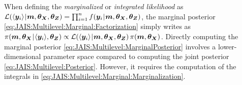 When defining the \textit{marginalized} or \textit{integrated likelihood} as 
\(\mathcal{L}(\langle{\bm{y}_i}\rangle {\:\!}|{\:\!} \bm{m},\bm{\theta}_{\bm{X}}, \bm{\theta}_{\bm{Z}}) = \prod_{i=1}^n f(\bm{y}_i {\:\!}|{\:\!} \bm{m},\bm{\theta}_{\bm{X}},\bm{\theta}_{\bm{Z}})\),
the marginal posterior \cref{eq:JAIS:Multilevel:Marginal:Factorization} simply writes as \(\pi(\bm{m},\bm{\theta}_{\bm{X}} {\:\!}|{\:\!} \langle{\bm{y}_i}\rangle,\bm{\theta}_{\bm{Z}}) \propto
\mathcal{L}(\langle{\bm{y}_i}\rangle {\:\!}|{\:\!} \bm{m},\bm{\theta}_{\bm{X}}, \bm{\theta}_{\bm{Z}}) \, \pi(\bm{m},\bm{\theta}_{\bm{X}})\).
Directly computing the marginal posterior \cref{eq:JAIS:Multilevel:MarginalPosterior} involves a lower-dimensional parameter space compared to computing the joint posterior \cref{eq:JAIS:Multilevel:Posterior}.
However, it requires the computation of the integrals in \cref{eq:JAIS:Multilevel:Marginal:Marginalization}.